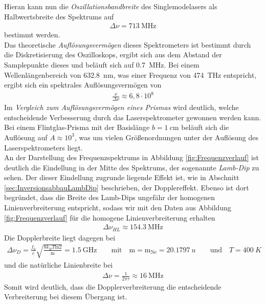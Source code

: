 \documentclass[a4paper,twoside,final]{article}
\begin{document}
Hieran kann nun die \textit{Oszillationsbandbreite} des Singlemodelasers als Halbwertsbreite des Spektrums auf
\begin{align}
  \Delta \nu = \SI{713}{\mega\hertz}
\end{align}
bestimmt werden.\\
Das theoretische \textit{Auflösungsvermögen} dieses Spektrometers ist bestimmt durch die Diskretisierung des Oszilloskops, ergibt sich aus dem Abstand der Samplepunkte dieses und beläuft sich auf \SI{0,7}{\mega\hertz}. Bei einem Wellenlängenbereich von \SI{632,8}{\nano\meter}, was einer Frequenz von \SI{474}{\tera\hertz} entspricht,  ergibt sich ein spektrales Auflösungsvermögen von
\begin{align}
  \frac{\nu}{\Delta\nu} \approx 6,8\cdot10^8
\end{align}
Im \textit{Vergleich zum Auflösungsvermögen eines Prismas} wird deutlich, welche entscheidende Verbesserung durch das Laserspektrometer gewonnen werden kann. Bei einem Flintglas-Prisma mit der Basislänge $b =\SI{1}{\centi\meter}$ beläuft sich die Auflösung auf $A \approx 10^3$, was um vielen Größenordnungen unter der Auflösung des Laserspektrometers liegt. \\
An der Darstellung des Frequenzspektrums in Abbildung \ref{fig:Frequenzverlauf} ist deutlich die Eindellung in der Mitte des Spektrums, der sogenannte \textit{Lamb-Dip} zu sehen. Der dieser Eindellung zugrunde liegende Effekt ist, wie in Abschnitt \ref{sec:InversionsabbauLambDip} beschrieben, der Dopplereffekt. Ebenso ist dort begründet, dass die Breite des Lamb-Dips ungefähr der homogenen Linienverbreiterung entspricht, sodass wir mit den Daten aus Abbildung \ref{fig:Frequenzverlauf} für die homogene Linienverbreiterung erhalten
\begin{align}
  \Delta \nu_{HL} \approx \SI{154,3}{\mega \hertz}
\end{align}
Die Dopplerbreite liegt dagegen bei
\begin{align}
  \Delta \nu_{D}= \frac{f_0}{c} \sqrt{\frac{8 k_B T \text{ln} 2}{\text{m}}} = \SI{1,5}{\giga\hertz} \qquad \text{mit}\quad \text{m} = \text{m}_{\text{Ne}}
 = \SI{20,1797}{u} \qquad \text{und} \quad T= \SI{400}{K}
\end{align}
und die natürliche Linienbreite bei
\begin{align}
  \Delta \nu = \frac{1}{2\pi\tau}\approx \SI{16}{\mega\hertz}
\end{align}
Somit wird deutlich, dass die Dopplerverbreiterung die entscheidende Verbreiterung bei diesem Übergang ist.
\end{document}

